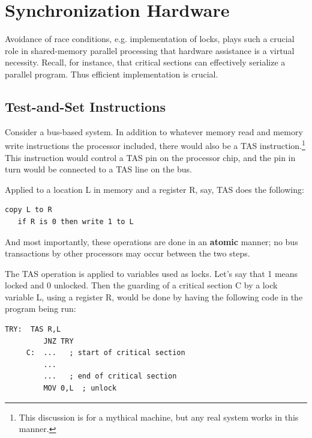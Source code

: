 
\section{Synchronization Hardware}

Avoidance of race conditions, e.g. implementation of locks, plays such a
crucial role in shared-memory parallel processing that hardware
assistance is a virtual necessity.  Recall, for instance, that critical
sections can effectively serialize a parallel program.  Thus efficient
implementation is crucial.

\subsection{Test-and-Set Instructions}

Consider a bus-based system. In addition to whatever memory read and
memory write instructions the processor included, there would also be a
TAS instruction.\footnote{This discussion is for a mythical machine, but
any real system works in this manner.}  This instruction would control a
TAS pin on the processor chip, and the pin in turn would be connected to
a TAS line on the bus.

Applied to a location L in memory and a register R, say, TAS does the
following:

\begin{Verbatim}[fontsize=\relsize{-2}]
   copy L to R
   if R is 0 then write 1 to L 
\end{Verbatim}

And most importantly, these operations are done in an \textbf{atomic}
manner; no bus transactions by other processors may occur between the
two steps.

The TAS operation is applied to variables used as locks. Let's say that
1 means locked and 0 unlocked. Then the guarding of a critical section C
by a lock variable L, using a register R, would be done by having the
following code in the program being run:

\begin{Verbatim}[fontsize=\relsize{-2}]
   TRY:  TAS R,L
         JNZ TRY
     C:  ...   ; start of critical section
         ...
         ...   ; end of critical section
         MOV 0,L  ; unlock
\end{Verbatim}

